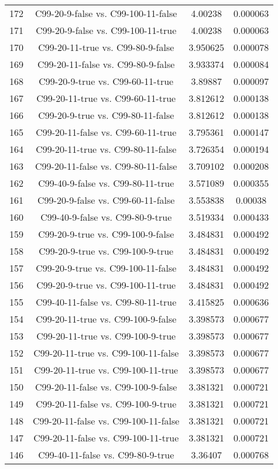 \documentclass[a4paper,10pt]{article}
\begin{document}
\begin{landscape}
\begin{table}[!htp]
\begin{tabular}{cccc}
172&C99-20-9-false vs. C99-100-11-false&4.00238&0.000063\\
171&C99-20-9-false vs. C99-100-11-true&4.00238&0.000063\\
170&C99-20-11-true vs. C99-80-9-false&3.950625&0.000078\\
169&C99-20-11-false vs. C99-80-9-false&3.933374&0.000084\\
168&C99-20-9-true vs. C99-60-11-true&3.89887&0.000097\\
167&C99-20-11-true vs. C99-60-11-true&3.812612&0.000138\\
166&C99-20-9-true vs. C99-80-11-false&3.812612&0.000138\\
165&C99-20-11-false vs. C99-60-11-true&3.795361&0.000147\\
164&C99-20-11-true vs. C99-80-11-false&3.726354&0.000194\\
163&C99-20-11-false vs. C99-80-11-false&3.709102&0.000208\\
162&C99-40-9-false vs. C99-80-11-true&3.571089&0.000355\\
161&C99-20-9-false vs. C99-60-11-false&3.553838&0.00038\\
160&C99-40-9-false vs. C99-80-9-true&3.519334&0.000433\\
159&C99-20-9-true vs. C99-100-9-false&3.484831&0.000492\\
158&C99-20-9-true vs. C99-100-9-true&3.484831&0.000492\\
157&C99-20-9-true vs. C99-100-11-false&3.484831&0.000492\\
156&C99-20-9-true vs. C99-100-11-true&3.484831&0.000492\\
155&C99-40-11-false vs. C99-80-11-true&3.415825&0.000636\\
154&C99-20-11-true vs. C99-100-9-false&3.398573&0.000677\\
153&C99-20-11-true vs. C99-100-9-true&3.398573&0.000677\\
152&C99-20-11-true vs. C99-100-11-false&3.398573&0.000677\\
151&C99-20-11-true vs. C99-100-11-true&3.398573&0.000677\\
150&C99-20-11-false vs. C99-100-9-false&3.381321&0.000721\\
149&C99-20-11-false vs. C99-100-9-true&3.381321&0.000721\\
148&C99-20-11-false vs. C99-100-11-false&3.381321&0.000721\\
147&C99-20-11-false vs. C99-100-11-true&3.381321&0.000721\\
146&C99-40-11-false vs. C99-80-9-true&3.36407&0.000768\\

\end{tabular}
\end{table}
\end{landscape}
\end{document}
